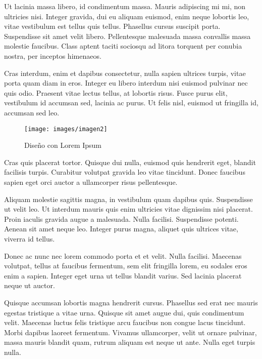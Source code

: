 \documentclass[12pt,a4paper]{report}
\begin{document}
Ut lacinia massa libero, id condimentum massa. Mauris adipiscing mi mi, non ultricies nisi. Integer gravida, dui eu aliquam euismod, enim neque lobortis leo, vitae vestibulum est tellus quis tellus. Phasellus cursus suscipit porta. Suspendisse sit amet velit libero. Pellentesque malesuada massa convallis massa molestie faucibus. Class aptent taciti sociosqu ad litora torquent per conubia nostra, per inceptos himenaeos. 

Cras interdum, enim et dapibus consectetur, nulla sapien ultrices turpis, vitae porta quam diam in eros. Integer eu libero interdum nisi euismod pulvinar nec quis odio. Praesent vitae lectus tellus, at lobortis risus. Fusce purus elit, vestibulum id accumsan sed, lacinia ac purus. Ut felis nisl, euismod ut fringilla id, accumsan sed leo. 



\begin{figure}[h]
\centering
\texttt{[image: images/imagen2]}
\caption{Diseño con Lorem Ipsum}
\label{figure.diseno}
\end{figure}




Cras quis placerat tortor. Quisque dui nulla, euismod quis hendrerit eget, blandit facilisis turpis. Curabitur volutpat gravida leo vitae tincidunt. Donec faucibus sapien eget orci auctor a ullamcorper risus pellentesque.

Aliquam molestie sagittis magna, in vestibulum quam dapibus quis. Suspendisse ut velit leo. Ut interdum mauris quis enim ultricies vitae dignissim nisi placerat. Proin iaculis gravida augue a malesuada. Nulla facilisi. Suspendisse potenti. Aenean sit amet neque leo. Integer purus magna, aliquet quis ultrices vitae, viverra id tellus. 

Donec ac nunc nec lorem commodo porta et et velit. Nulla facilisi. Maecenas volutpat, tellus at faucibus fermentum, sem elit fringilla lorem, eu sodales eros enim a sapien. Integer eget urna ut tellus blandit varius. Sed lacinia placerat neque ut auctor.

Quisque accumsan lobortis magna hendrerit cursus. Phasellus sed erat nec mauris egestas tristique a vitae urna. Quisque sit amet augue dui, quis condimentum velit. Maecenas luctus felis tristique arcu faucibus non congue lacus tincidunt. Morbi dapibus laoreet fermentum. Vivamus ullamcorper, velit ut ornare pulvinar, massa mauris blandit quam, rutrum aliquam est neque ut ante. Nulla eget turpis nulla. 
\end{document}
